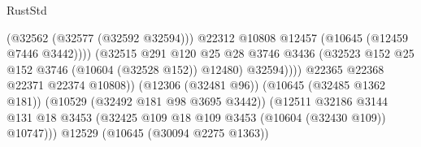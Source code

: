 \begin{lexlean}{RustStd}
\begin{coremodule}
                                                          (@32562 (@32577 (@32592 @32594)))
                                                          @22312
                                                          @10808
                                                          @12457
                                                          (@10645 (@12459 @7446 @3442))))
                                                      (@32515
                                                        @291
                                                        @120
                                                        @25
                                                        @28
                                                        @3746
                                                        @3436
                                                        (@32523
                                                          @152
                                                          @25
                                                          @152
                                                          @3746
                                                          (@10604 (@32528 @152))
                                                          @12480)
                                                        @32594))))
                                                @22365
                                                @22368
                                                @22371
                                                @22374
                                                @10808))
                                            (@12306 (@32481 @96))
                                            (@10645 (@32485 @1362 @181))
                                            (@10529 (@32492 @181 @98 @3695 @3442))
                                            (@12511
                                              @32186
                                              @3144
                                              @131
                                              @18
                                              @3453
                                              (@32425
                                                @109
                                                @18
                                                @109
                                                @3453
                                                (@10604 (@32430 @109))
                                                @10747)))
                                          @12529
                                          (@10645 (@30094 @2275 @1363))

\end{coremodule}
\end{lexlean}
